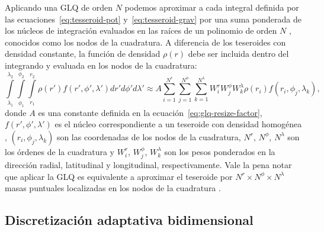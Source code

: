 Aplicando una \ac{GLQ} de orden $N$ podemos aproximar a cada integral definida
por las ecuaciones~\ref{eq:tesseroid-pot} y~\ref{eq:tesseroid-grav} por una
suma ponderada de los núcleos de integración evaluados en las raíces de un
polinomio de orden $N$ \citep[p.~390]{hildebrand1987}, conocidos como los nodos
de la cuadratura.
A diferencia de los teseroides con densidad constante, la función de densidad
$\rho(r)$ debe ser incluida dentro del integrando y evaluada en los nodos de la
cuadratura:
%
\begin{equation}
        \int\limits_{\lambda_1}^{\lambda_2}
        \int\limits_{\phi_1}^{\phi_2}
        \int\limits_{r_1}^{r_2}
        \rho(r') f(r', \phi', \lambda')
        dr' d\phi' d\lambda' \approx
        A
        \sum\limits_{i=1}^{N^r}
        \sum\limits_{j=1}^{N^\phi}
        \sum\limits_{k=1}^{N^\lambda}
        W_i^r W_j^\phi W_k^\lambda
        \rho(r_i) f(r_i, \phi_j, \lambda_k),
\label{eq:glq-var-dens}
\end{equation}
%
donde $A$ es una constante definida en la
ecuación~\ref{eq:glq-resize-factor}, $f(r', \phi', \lambda')$ es el núcleo
correspondiente a un teseroide con densidad homogénea \citep{grombein2013},
$(r_i, \phi_j, \lambda_k)$ son las coordenadas de los nodos de la cuadratura,
$N^r$, $N^\phi$, $N^\lambda$ son los órdenes de la cuadratura y $W_i^r$,
$W_j^\phi$, $W_k^\lambda$ son los pesos ponderados en la dirección radial,
latitudinal y longitudinal, respectivamente.
Vale la pena notar que aplicar la \ac{GLQ} es equivalente a aproximar el
teseroide por $N^r \times N^\phi \times N^\lambda$ masas puntuales localizadas
en los nodos de la cuadratura \citep{ku1977, asgharzadeh2007}.


\subsection{Discretización adaptativa bidimensional}


